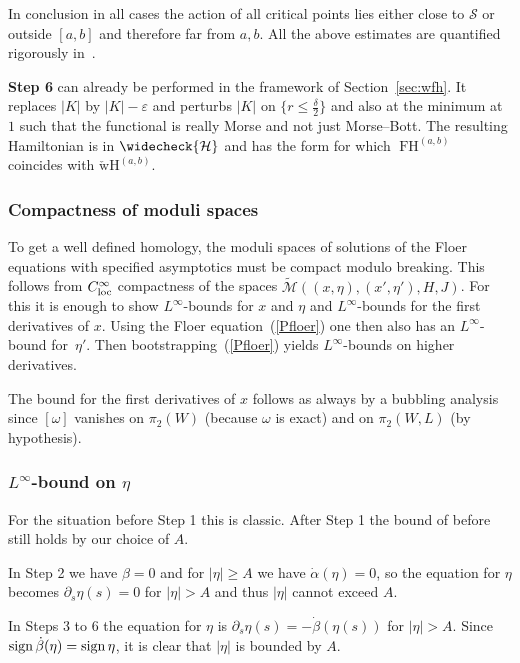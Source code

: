 \documentclass{amsart}
\newcommand{\Hcal}{{\mathcal{H}}}
\newcommand{\Mcal}{{\mathcal{M}}}
\newcommand{\Scal}{{\mathcal{S}}}
\newcommand{\FH}{\operatorname{FH}}
\newcommand{\WcheckH}{\operatorname{\check wH}}
\newcommand{\tiilde}{\widetilde}
\theoremstyle{definition}
\theoremstyle{remark}
\numberwithin{equation}{section}
\begin{document}
In conclusion in all cases the action of all critical points lies either close to $\Scal$ or outside $[a,b]$ and therefore far from $a,b$. All the above estimates are quantified rigorously in~\cite[Section 6, Step 4]{CFO10}.

\textbf{Step 6} can already be performed in the framework of Section~\ref{sec:wfh}. It replaces $|K|$ by $|K|-\varepsilon$ and perturbs $|K|$ on $\{r\leq\frac \delta2\}$ and also at the minimum at $1$ such that the functional is really Morse and not just Morse--Bott. The resulting Hamiltonian is in $\widecheck\Hcal$ and has the form for which $\FH^{(a,b)}$ coincides with $\WcheckH^{(a,b)}$.

\subsubsection*{Compactness of moduli spaces} 
To get a well defined homology, the moduli spaces of solutions of the Floer equations with specified asymptotics must be compact modulo breaking. This follows from $C^\infty_{\rm loc}$ compactness of the spaces $\tiilde \Mcal((x,\eta),(x',\eta'),H,J)$. For this it is enough to show $L^\infty$-bounds for $x$ and $\eta$ and $L^\infty$-bounds for the first derivatives of $x$. Using the Floer equation~(\ref{Pfloer}) one then also has an $L^\infty$-bound for~$\eta'$. Then bootstrapping~(\ref{Pfloer}) yields $L^\infty$-bounds on higher derivatives.

The bound for the first derivatives of $x$ follows as always by a bubbling analysis since $[\omega]$ vanishes on $\pi_2(W)$ (because $\omega$ is exact) and on $\pi_2(W,L)$ (by hypothesis). 

\subsubsection*{$L^\infty$-bound on $\eta$}
For the situation before Step 1 this is classic. After Step 1 the bound of before still holds by our choice of $A$. 

In Step 2 we have $\beta=0$ and for $|\eta|\geq A$ we have $\dot\alpha(\eta)=0$, so the equation for $\eta$ becomes $\partial_s\eta(s)=0$ for $|\eta|>A$ and thus $|\eta|$ cannot exceed $A$. 

In Steps 3 to 6 the equation for $\eta$ is $\partial_s\eta(s)=-\dot\beta(\eta(s))$ for $|\eta|>A$. Since ${\rm sign}\,\dot\beta(\eta)={\rm sign}\,\eta$, it is clear that $|\eta|$ is bounded by $A$.
\end{document}

